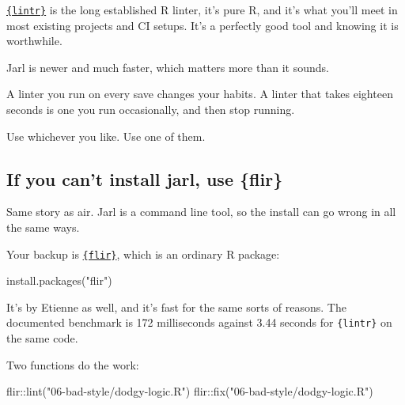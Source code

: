 \documentclass[
  letterpaper,
  justified,
  a4paper]{tufte-book}
\makeatletter
\newenvironment{Shaded}{\begin{snugshade}}{\end{snugshade}}
\newcommand{\FunctionTok}[1]{\textcolor[rgb]{0.28,0.35,0.67}{#1}}
\newcommand{\NormalTok}[1]{\textcolor[rgb]{0.00,0.23,0.31}{#1}}
\newcommand{\SpecialCharTok}[1]{\textcolor[rgb]{0.37,0.37,0.37}{#1}}
\newcommand{\StringTok}[1]{\textcolor[rgb]{0.13,0.47,0.30}{#1}}
\let\rbporigShaded\Shaded
\let\rbporigendShaded\endShaded
\renewenvironment{Shaded}{%
  \begingroup
  \ifdim\linewidth=\rbpbodywidth
    \advance\linewidth by \@tufte@overhang
    \advance\hsize by \@tufte@overhang
    \advance\columnwidth by \@tufte@overhang
  \fi
  \rbporigShaded
}{%
  \rbporigendShaded
  \endgroup
}
\makeatother
\begin{document}
\begin{tcolorbox}[enhanced jigsaw, arc=.35mm, bottomrule=.15mm, bottomtitle=1mm, breakable, colback=white, colbacktitle=quarto-callout-tip-color!10!white, colframe=quarto-callout-tip-color-frame, coltitle=black, left=2mm, leftrule=.75mm, opacityback=0, opacitybacktitle=0.6, rightrule=.15mm, title=\textcolor{quarto-callout-tip-color}{\faLightbulb}\hspace{0.5em}{What about lintr?}, titlerule=0mm, toprule=.15mm, toptitle=1mm]

\href{https://lintr.r-lib.org/}{\texttt{\{lintr\}}} is the long
established R linter, it's pure R, and it's what you'll meet in most
existing projects and CI setups. It's a perfectly good tool and knowing
it is worthwhile.

Jarl is newer and much faster, which matters more than it sounds.

A linter you run on every save changes your habits. A linter that takes
eighteen seconds is one you run occasionally, and then stop running.

Use whichever you like. Use one of them.

\end{tcolorbox}

\subsection{If you can't install jarl, use
\{flir\}}\label{if-you-cant-install-jarl-use-flir}

Same story as air. Jarl is a command line tool, so the install can go
wrong in all the same ways.

Your backup is
\href{https://flir.etiennebacher.com/}{\texttt{\{flir\}}}, which is an
ordinary R package:

\begin{Shaded}
\begin{Highlighting}[]
\FunctionTok{install.packages}\NormalTok{(}\StringTok{"flir"}\NormalTok{)}
\end{Highlighting}
\end{Shaded}

It's by Etienne as well, and it's fast for the same sorts of reasons.
The documented benchmark is 172 milliseconds against 3.44 seconds for
\texttt{\{lintr\}} on the same code.

Two functions do the work:

\begin{Shaded}
\begin{Highlighting}[]
\NormalTok{flir}\SpecialCharTok{::}\FunctionTok{lint}\NormalTok{(}\StringTok{"06{-}bad{-}style/dodgy{-}logic.R"}\NormalTok{)}
\NormalTok{flir}\SpecialCharTok{::}\FunctionTok{fix}\NormalTok{(}\StringTok{"06{-}bad{-}style/dodgy{-}logic.R"}\NormalTok{)}
\end{Highlighting}
\end{Shaded}
\end{document}
